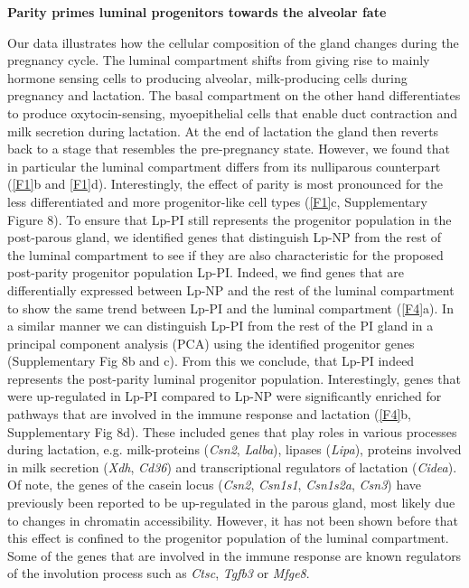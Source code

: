 \documentclass[titlepage, 12pt, oneside]{amsart}
\begin{document}
\textbf{Parity primes luminal progenitors towards the alveolar fate}

Our data illustrates how the cellular composition of the gland changes during the pregnancy cycle.
The luminal compartment shifts from giving rise to mainly hormone sensing cells to producing alveolar, milk-producing cells during pregnancy and lactation. 
The basal compartment on the other hand differentiates to produce oxytocin-sensing, myoepithelial cells that enable duct contraction and milk secretion during lactation.
At the end of lactation the gland then reverts back to a stage that resembles the pre-pregnancy state.
However, we found that in particular the luminal compartment differs from its nulliparous counterpart (\autoref{F1}b and \autoref{F1}d).
Interestingly, the effect of parity is most pronounced for the less differentiated and more progenitor-like cell types (\autoref{F1}c, Supplementary Figure 8).
To ensure that Lp-PI still represents the progenitor population in the post-parous gland, we identified genes that distinguish Lp-NP from the rest of the luminal compartment to see if they are also characteristic for the proposed post-parity progenitor population Lp-PI.
Indeed, we find genes that are differentially expressed between Lp-NP and the rest of the luminal compartment to show the same trend between Lp-PI and the luminal compartment (\autoref{F4}a).
In a similar manner we can distinguish Lp-PI from the rest of the PI gland in a principal component analysis (PCA) using the identified progenitor genes (Supplementary Fig 8b and c).
From this we conclude, that Lp-PI indeed represents the post-parity luminal progenitor population.
Interestingly, genes that were up-regulated in Lp-PI compared to Lp-NP were significantly enriched for pathways that are involved in the immune response and lactation (\autoref{F4}b, Supplementary Fig 8d).
These included genes that play roles in various processes during lactation, e.g. milk-proteins (\textit{Csn2}, \textit{Lalba}), lipases (\textit{Lipa}), proteins involved in milk secretion (\textit{Xdh}, \textit{Cd36}) and transcriptional regulators of lactation (\textit{Cidea}).
Of note, the genes of the casein locus (\textit{Csn2}, \textit{Csn1s1}, \textit{Csn1s2a}, \textit{Csn3}) have previously been reported to be up-regulated in the parous gland, most likely due to changes in chromatin accessibility\autocite{Dos2015,Rijnkels2013}.
However, it has not been shown before that this effect is confined to the progenitor population of the luminal compartment.
Some of the genes that are involved in the immune response are known regulators of the involution process such as \textit{Ctsc}, \textit{Tgfb3} or \textit{Mfge8}.
\end{document}
